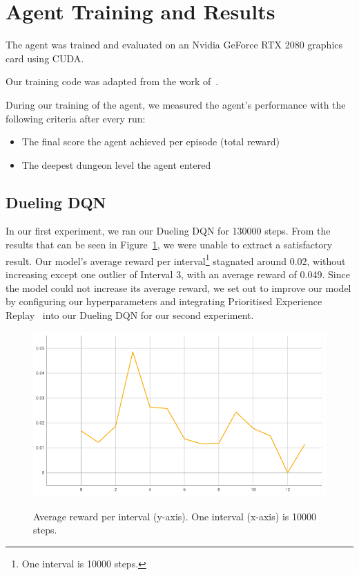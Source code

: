 \documentclass[12pt,a4paper]{article}
\begin{document}
    \section{Agent Training and Results}\label{sec:agent-training-and-results}
    The agent was trained and evaluated on an Nvidia GeForce RTX 2080 graphics card using CUDA.

    Our training code was adapted from the work of~\citet{sebtheiler}.

    During our training of the agent, we measured the agent's performance with the following criteria after every run:

    \begin{itemize}
        \item The final score the agent achieved per episode (total reward)
        \item The deepest dungeon level the agent entered
    \end{itemize}

    \subsection{Dueling DQN}\label{subsec:dueling-dqn}
    In our first experiment, we ran our Dueling DQN for 130000 steps.
    From the results that can be seen in Figure~\ref{fig:ddqn_interval_score}, we were unable to extract a satisfactory result.
    Our model's average reward per interval\footnote{One interval is 10000 steps.} stagnated around 0.02, without increasing except one outlier of Interval 3, with an average reward of 0.049.
    Since the model could not increase its average reward, we set out to improve our model by configuring our hyperparameters and integrating Prioritised Experience Replay~\citet{schaul16} into our Dueling DQN for our second experiment.
    \begin{figure}[H]
        \caption[DDQN: Average reward per interval.]{Average reward per interval (y-axis). One interval (x-axis) is 10000 steps.}
        \centering
        \includegraphics[scale=0.5]{interval_score_ddqn}
        \label{fig:ddqn_interval_score}
    \end{figure}
\end{document}
